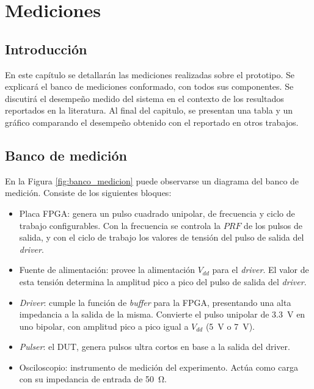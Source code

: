 \chapter{Mediciones}

\section{Introducción}

En este capítulo se detallarán las mediciones realizadas sobre el prototipo. Se
explicará el banco de mediciones conformado, con todos sus componentes. Se
discutirá el desempeño medido del sistema en el contexto de los resultados
reportados en la literatura. Al final del capitulo, se presentan una tabla y un
gráfico comparando el desempeño obtenido con el reportado en otros trabajos.

\section{Banco de medición}

En la Figura \ref{fig:banco_medicion} puede observarse un diagrama del banco de
medición. Consiste de los siguientes bloques:

\begin{itemize}
    \item Placa FPGA: genera un pulso cuadrado unipolar, de frecuencia y ciclo
      de trabajo configurables. Con la frecuencia se controla la $PRF$ de los
      pulsos de salida, y con el ciclo de trabajo los valores de tensión del
      pulso de salida del \textit{driver}.
    \item Fuente de alimentación: provee la alimentación $V_{dd}$ para el
     \textit{driver}. El valor de esta tensión determina la amplitud pico a pico del
      pulso de salida del \textit{driver}.
    \item \textit{Driver}: cumple la función de \textit{buffer} para la
	FPGA, presentando una alta impedancia a la salida de la misma.
      Convierte el pulso unipolar de \qty{3.3}{\volt} en uno bipolar, con
      amplitud pico a pico igual a $V_{dd}$ (\qty{5}{\volt} o \qty{7}{\volt}).
    \item \textit{Pulser}: el DUT, genera pulsos ultra cortos en base 
      a la salida del driver.
    \item Osciloscopio: instrumento de medición del experimento. Actúa como
      carga con su impedancia de entrada de \qty{50}{\ohm}.
\end{itemize}

